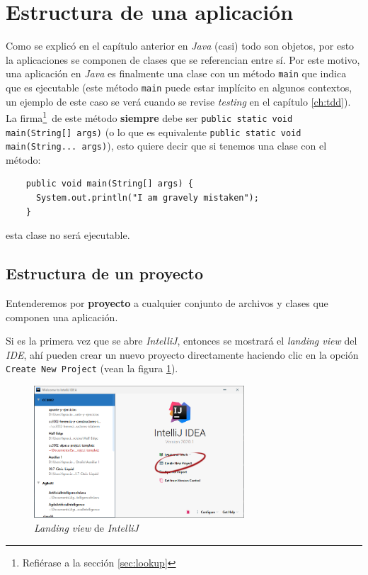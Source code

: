 \section{Estructura de una aplicación}
  Como se explicó en el capítulo anterior en \textit{Java} (casi) todo son objetos, por 
  esto la aplicaciones se componen de clases que se referencian entre sí.
  Por este motivo, una aplicación en \textit{Java} es finalmente una clase con un método
  \texttt{main} que indica que es ejecutable (este método \texttt{main} puede estar 
  implícito en algunos contextos, un ejemplo de este caso se verá cuando se revise 
  \textit{testing} en el capítulo \ref{ch:tdd}).
  La firma\footnote{Refiérase a la sección \ref{sec:lookup}}\ de este método 
  \textbf{siempre} debe ser \texttt{public static void main(String[] args)}
  (o lo que es equivalente \texttt{public static void main(String... args)}), 
  esto quiere decir que si tenemos una clase con el método:

  \begin{verbatim}
    public void main(String[] args) {
      System.out.println("I am gravely mistaken");
    }
  \end{verbatim}

  esta clase no será ejecutable.

  \subsection{Estructura de un proyecto}
    Entenderemos por \textbf{proyecto} a cualquier conjunto de archivos y clases que 
    componen una aplicación.
    
    Si es la primera vez que se abre \textit{IntelliJ}, entonces se mostrará el 
    \textit{landing view} del \textit{IDE}, ahí pueden crear un nuevo proyecto 
    directamente haciendo clic en la opción \texttt{Create New Project} (vean la figura 
    \ref{fig:intellij-lv}).

    \begin{figure}[ht!]
      \centering
      \includegraphics[width=0.7\textwidth]{img/Profundizando en Java/IntelliJ Landing.png}
      \caption{\textit{Landing view} de \textit{IntelliJ}}
      \label{fig:intellij-lv}
    \end{figure}


